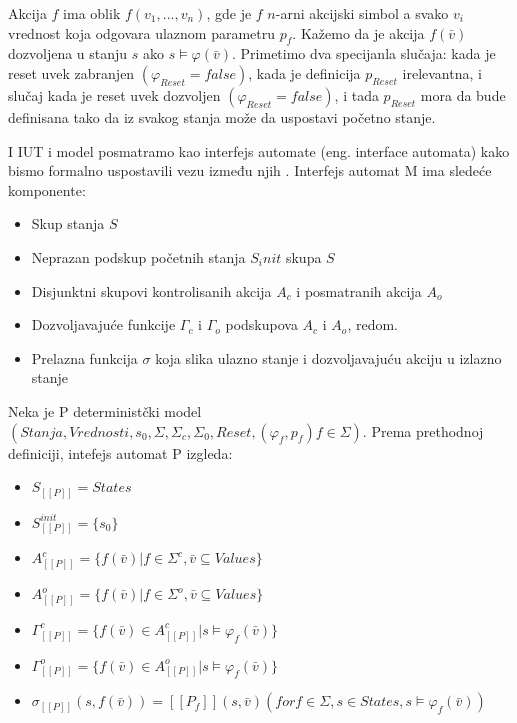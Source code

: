 \documentclass[a4paper]{article}
\theoremstyle{definition}
\begin{document}
{Akcija $f$ ima oblik $f(v_1,...,v_n)$, gde je $f$ $n$-arni akcijski simbol a svako $v_i$ vrednost koja odgovara ulaznom parametru $p_f$. Kažemo da je akcija $f(\bar{v})$ dozvoljena u stanju $s$ ako $s \models \varphi(\bar{v})$. Primetimo dva specijanla slučaja: kada je reset uvek zabranjen $(\varphi_{Reset} = false)$, kada je definicija $p_{Reset}$ irelevantna, i slučaj kada je reset uvek dozvoljen $(\varphi_{Reset} = false)$, i tada $p_{Reset}$ mora da bude definisana tako da iz svakog stanja može da uspostavi početno stanje.

I IUT i model posmatramo kao interfejs automate (eng. interface automata) kako bismo formalno uspostavili vezu između njih \cite{interfaceAutomata}.
Interfejs automat M ima sledeće komponente:
\begin{itemize}
\item Skup stanja $S$
\item Neprazan podskup početnih stanja $S_init$ skupa $S$
\item Disjunktni skupovi kontrolisanih akcija $A_c$ i posmatranih akcija $A_o$
\item Dozvoljavajuće funkcije $\Gamma_c$ i $\Gamma_o$ podskupova $A_c$ i $A_o$, redom.
\item Prelazna funkcija $\sigma$ koja slika ulazno stanje i dozvoljavajuću akciju u izlazno stanje
\end{itemize}

Neka je P deterministčki model $(Stanja, Vrednosti, s_0, \Sigma, \Sigma_c, \Sigma_0, Reset, (\varphi_f, p_f)f \in \Sigma)$. Prema prethodnoj definiciji, intefejs automat P izgleda:

\begin{itemize}
\item $S_{[[P]]} = States$
\item $S^{init}_{[[P]]} = \{s_0\}$
\item $A^c_{[[P]]} = \{ f(\bar{v}) | f \in \Sigma^c, \bar{v} \subseteq Values \}$ 
\item $A^o_{[[P]]} = \{ f(\bar{v}) | f \in \Sigma^o, \bar{v} \subseteq Values \}$
\item $\Gamma^c_{[[P]]} = \{ f(\bar{v}) \in A^c_{[[P]]} | s \models \varphi_f(\bar{v}) \}$ 
\item $\Gamma^o_{[[P]]} = \{ f(\bar{v}) \in A^o_{[[P]]} | s \models \varphi_f(\bar{v}) \}$
\item $\sigma_{[[P]]}(s, f(\bar{v})) = [[P_f]](s, \bar{v}) (for f \in \Sigma, s \in States, s \models \varphi_f(\bar{v}))$
\end{itemize}

}
\end{document}

